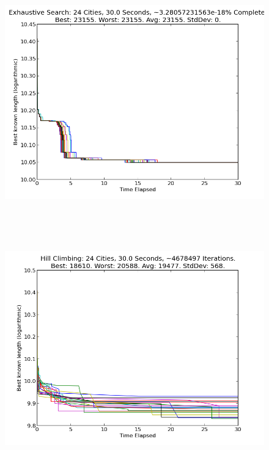\documentclass[10pt, conference, compsocconf]{IEEEtran}
\begin{document}
\newpage
$ $
\newpage
\begin{figure}[t]
  \centering
    \includegraphics[width=1\textwidth]{../Example_Output_Images/24_cities/30_seconds/exhaustiveSearch.png}
\end{figure}
$ $


\newpage
$ $
\newpage
\begin{figure}[t]
  \centering
    \includegraphics[width=1\textwidth]{../Example_Output_Images/24_cities/30_seconds/hillClimbing.png}
\end{figure}
$ $
\end{document}

